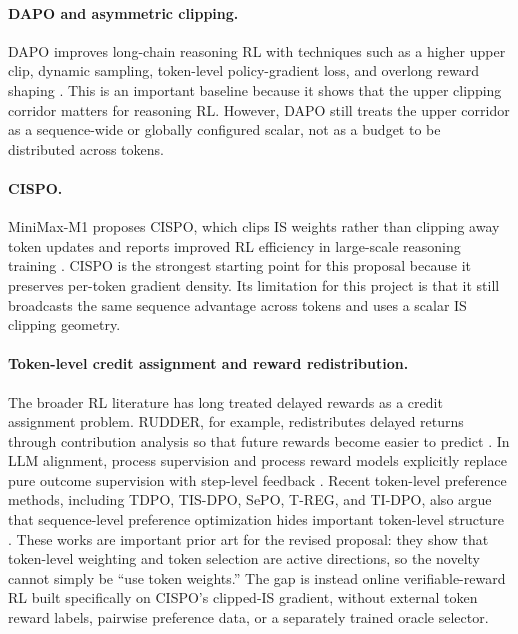 \documentclass[11pt]{article}
\begin{document}
\paragraph{DAPO and asymmetric clipping.}
DAPO improves long-chain reasoning RL with techniques such as a higher upper
clip, dynamic sampling, token-level policy-gradient loss, and overlong reward
shaping \cite{yu2025dapo}. This is an important baseline because it shows that
the upper clipping corridor matters for reasoning RL. However, DAPO still
treats the upper corridor as a sequence-wide or globally configured scalar,
not as a budget to be distributed across tokens.

\paragraph{CISPO.}
MiniMax-M1 proposes CISPO, which clips IS weights rather than clipping away
token updates and reports improved RL efficiency in large-scale reasoning
training \cite{minimax2025m1}. CISPO is the strongest starting point for this
proposal because it preserves per-token gradient density. Its limitation for
this project is that it still broadcasts the same sequence advantage across
tokens and uses a scalar IS clipping geometry.

\paragraph{Token-level credit assignment and reward redistribution.}
The broader RL literature has long treated delayed rewards as a credit
assignment problem. RUDDER, for example, redistributes delayed returns through
contribution analysis so that future rewards become easier to predict
\cite{arjona2019rudder}. In LLM alignment, process supervision and process
reward models explicitly replace pure outcome supervision with step-level
feedback \cite{lightman2023verify}. Recent token-level preference methods,
including TDPO, TIS-DPO, SePO, T-REG, and TI-DPO, also argue that sequence-level
preference optimization hides important token-level structure
\cite{zeng2024tdpo,liu2025tisdpo,yang2025sepo,zhou2025treg,yang2025tidpo}.
These works are important prior art for the revised proposal: they show that
token-level weighting and token selection are active directions, so the novelty
cannot simply be ``use token weights.'' The gap is instead online
verifiable-reward RL built specifically on CISPO's clipped-IS gradient, without
external token reward labels, pairwise preference data, or a separately trained
oracle selector.
\end{document}

